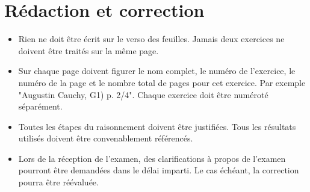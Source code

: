 \documentclass[12pt,a4paper]{article}
\begin{document}
\section{Rédaction et correction}
\begin{itemize}

	\item Rien ne doit être écrit sur le verso des feuilles. Jamais deux exercices ne doivent être traités sur la même page.
	
	\item Sur chaque page doivent figurer le nom complet, le numéro de l'exercice, le numéro de la page et le nombre total de pages pour cet exercice. Par exemple "Augustin Cauchy, G1) p. 2/4". Chaque exercice doit être numéroté séparément.
		
	\item Toutes les étapes du raisonnement doivent être justifiées. Tous les résultats utilisés doivent être convenablement référencés.
		
	\item Lors de la réception de l'examen, des clarifications à propos de l'examen pourront être demandées dans le délai imparti. Le cas échéant, la correction pourra être réévaluée.
	
\end{itemize}

\vfill

\end{document}
